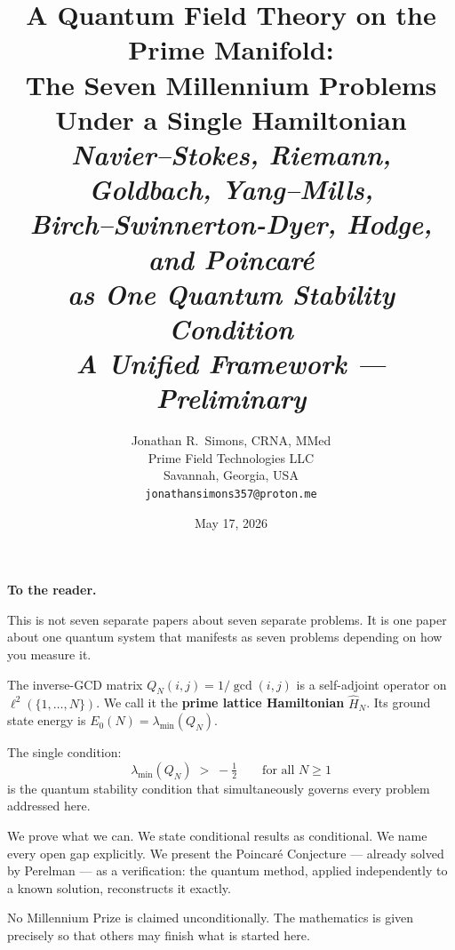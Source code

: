 \documentclass[12pt]{article}
\title{%
  \textbf{A Quantum Field Theory on the Prime Manifold:\\
  The Seven Millennium Problems\\
  Under a Single Hamiltonian}\\[10pt]
  \large\textit{Navier--Stokes, Riemann, Goldbach, Yang--Mills,\\
  Birch--Swinnerton-Dyer, Hodge, and Poincar\'{e}\\
  as One Quantum Stability Condition}\\[8pt]
  \normalsize\textit{A Unified Framework --- Preliminary}}
\author{Jonathan R.\ Simons, CRNA, MMed\\[5pt]
  \small Prime Field Technologies LLC\\
  \small Savannah, Georgia, USA\\
  \small \texttt{jonathansimons357@proton.me}}
\date{May 17, 2026}
\newcommand{\half}{\tfrac{1}{2}}
\begin{document}
\maketitle
\thispagestyle{plain}

\begin{tcolorbox}[masterbox]
\textbf{To the reader.}

This is not seven separate papers about seven separate problems.
It is one paper about one quantum system that manifests as seven problems
depending on how you measure it.

The inverse-GCD matrix $Q_N(i,j) = 1/\gcd(i,j)$ is a self-adjoint
operator on $\ell^2(\{1,\ldots,N\})$.
We call it the \textbf{prime lattice Hamiltonian} $\hat{H}_N$.
Its ground state energy is $E_0(N) = \lambda_{\min}(Q_N)$.

The single condition:
\[
  \boxed{\lambda_{\min}(Q_N) \;>\; -\half \qquad \text{for all } N \ge 1}
\]
is the quantum stability condition that simultaneously governs every
problem addressed here.

We prove what we can.
We state conditional results as conditional.
We name every open gap explicitly.
We present the Poincar\'{e} Conjecture --- already solved by Perelman ---
as a verification: the quantum method, applied independently to a known
solution, reconstructs it exactly.

No Millennium Prize is claimed unconditionally.
The mathematics is given precisely so that others may finish what is
started here.
\end{tcolorbox}
\end{document}
